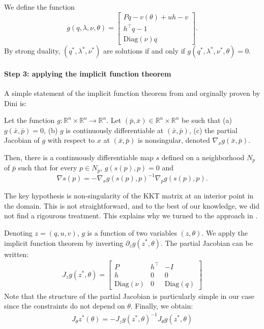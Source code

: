 We define the function
\begin{equation}
g(q, \lambda, \nu, \theta) = \begin{bmatrix}
    Pq - v(\theta) + uh - v\\
    h^\top q- 1\\
    \mathrm{Diag}(\nu)q
\end{bmatrix}.
\end{equation}
By strong duality, $(q^*, \lambda^*, \nu^*)$ are solutions if and only if $g(q^*, \lambda^*, \nu^*, \theta) = 0$.

\paragraph{Step 3: applying the implicit function theorem}
A simple statement of the implicit function theorem from \cite{rockafellar} and orginally proven by Dini is:
\begin{theorem}
Let the function $g: \mathbb R^n \times \mathbb R^n \to \mathbb R^n$. Let $(\bar p, \bar x)\in\mathbb R^n \times \mathbb R^n$ be such that (a) $g(\bar x, \bar p)=0$, (b) $g$ is continuously differentiable at $(\bar x, \bar p)$, (c) the partial Jacobian of $g$ with respect to $x$ at $(\bar x, \bar p)$ is nonsingular, denoted $\nabla_x g(\bar x, \bar p)$.

Then, there is a continuously differentiable map $s$ defined on a neighborhood $N_p$ of $\bar p$ such that for every $p\in N_p$, $g(s(p), p)=0$ and
\begin{equation}
\nabla s(p) = - \nabla_x g(s(p), p)^{-1}\nabla_p g(s(p), p).
\end{equation}
\end{theorem}

The key hypothesis is non-singularity of the KKT matrix at an interior point in the domain. This is not straightforward, and to the best of our knowledge, we did not find a rigourous treatment. This explains why we turned to the approach in \cite{shapiro}.

Denoting $z = (q, u, v)$, $g$ is a function of two variables $(z, \theta)$. We apply the implicit function theorem by inverting $\partial_z g(z^*, \theta)$. The partial Jacobian can be written:
\begin{align}
    J_z g(z^*, \theta) = \begin{bmatrix}
    P & h^\top  & - I\\
    h & 0 & 0\\
    \mathrm{Diag}(\nu)& 0 & \mathrm{Diag}(q)
    \end{bmatrix}
\end{align}
Note that the structure of the partial Jacobian is particularly simple in our case since the constraints do not depend on $\theta$. Finally, we obtain:
\begin{align}
    J_\theta z^*(\theta) = - J_zg(z^*, \theta)^{-1}J_\theta g(z^*, \theta)
\end{align}

